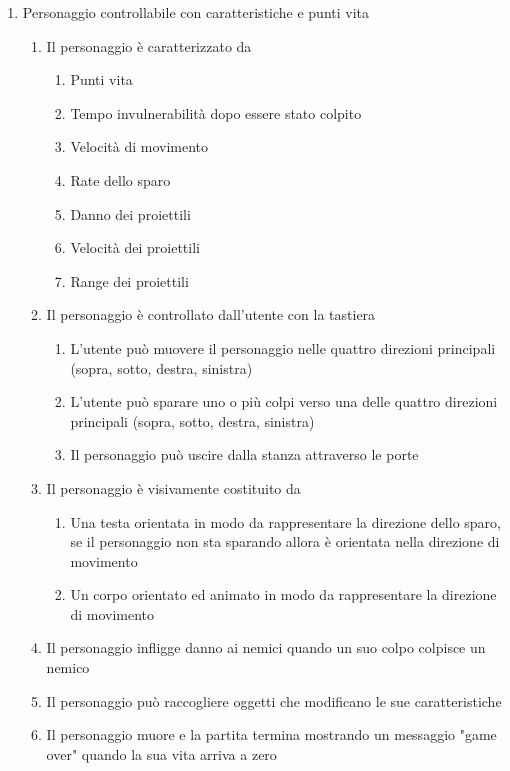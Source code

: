 \begin{enumerate}
\begin{enumerate}
    \end{enumerate}
    
    \item Personaggio controllabile con caratteristiche e punti vita
    \begin{enumerate}
        \item Il personaggio è caratterizzato da
            \begin{enumerate}
                \item Punti vita
                \item Tempo invulnerabilità dopo essere stato colpito
                \item Velocità di movimento
                \item Rate dello sparo
                \item Danno dei proiettili
                \item Velocità dei proiettili
                \item Range dei proiettili
            \end{enumerate}
        \item Il personaggio è controllato dall'utente con la tastiera
        \begin{enumerate}
            \item L'utente può muovere il personaggio nelle quattro direzioni principali (sopra, sotto, destra, sinistra)
            \item L'utente può sparare uno o più colpi verso una delle quattro direzioni principali (sopra, sotto, destra, sinistra)
            \item Il personaggio può uscire dalla stanza attraverso le porte
        \end{enumerate}
        \item Il personaggio è visivamente costituito da
        \begin{enumerate}
            \item Una testa orientata in modo da rappresentare la direzione dello sparo, se il personaggio non sta sparando allora è orientata nella direzione di movimento
            \item Un corpo orientato ed animato in modo da rappresentare la direzione di movimento
        \end{enumerate}
        \item Il personaggio infligge danno ai nemici quando un suo colpo colpisce un nemico
        \item Il personaggio può raccogliere oggetti che modificano le sue caratteristiche
        \item Il personaggio muore e la partita termina mostrando un messaggio "game over" quando la sua vita arriva a zero
    \end{enumerate}
    

\end{enumerate}
